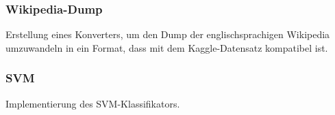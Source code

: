 \subsubsection{Wikipedia-Dump}

Erstellung eines Konverters, um den Dump der englischsprachigen Wikipedia umzuwandeln in ein Format, dass mit dem Kaggle-Datensatz kompatibel ist.

\subsubsection{SVM}
Implementierung des SVM-Klassifikators.
